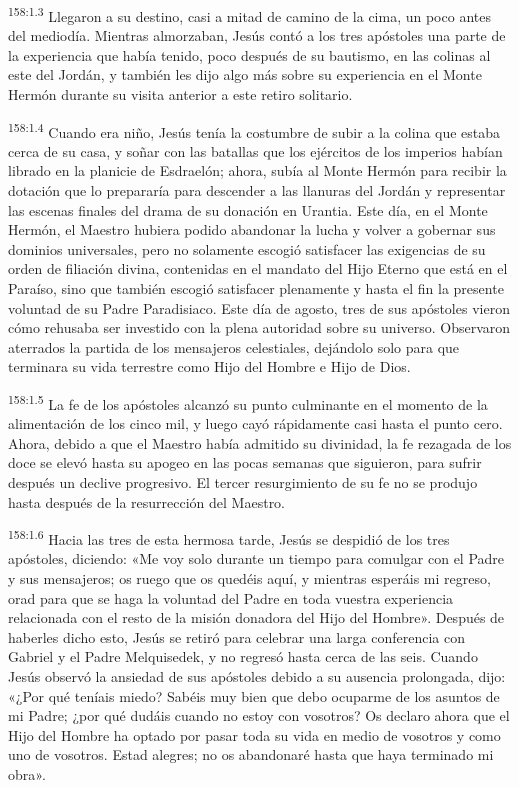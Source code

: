 \par 
\textsuperscript{158:1.3} Llegaron a su destino, casi a mitad de camino de la cima, un poco antes del mediodía. Mientras almorzaban, Jesús contó a los tres apóstoles una parte de la experiencia que había tenido, poco después de su bautismo, en las colinas al este del Jordán, y también les dijo algo más sobre su experiencia en el Monte Hermón durante su visita anterior a este retiro solitario.

\par 
\textsuperscript{158:1.4} Cuando era niño, Jesús tenía la costumbre de subir a la colina que estaba cerca de su casa, y soñar con las batallas que los ejércitos de los imperios habían librado en la planicie de Esdraelón; ahora, subía al Monte Hermón para recibir la dotación que lo prepararía para descender a las llanuras del Jordán y representar las escenas finales del drama de su donación en Urantia. Este día, en el Monte Hermón, el Maestro hubiera podido abandonar la lucha y volver a gobernar sus dominios universales, pero no solamente escogió satisfacer las exigencias de su orden de filiación divina, contenidas en el mandato del Hijo Eterno que está en el Paraíso, sino que también escogió satisfacer plenamente y hasta el fin la presente voluntad de su Padre Paradisiaco. Este día de agosto, tres de sus apóstoles vieron cómo rehusaba ser investido con la plena autoridad sobre su universo. Observaron aterrados la partida de los mensajeros celestiales, dejándolo solo para que terminara su vida terrestre como Hijo del Hombre e Hijo de Dios.

\par 
\textsuperscript{158:1.5} La fe de los apóstoles alcanzó su punto culminante en el momento de la alimentación de los cinco mil, y luego cayó rápidamente casi hasta el punto cero. Ahora, debido a que el Maestro había admitido su divinidad, la fe rezagada de los doce se elevó hasta su apogeo en las pocas semanas que siguieron, para sufrir después un declive progresivo. El tercer resurgimiento de su fe no se produjo hasta después de la resurrección del Maestro.

\par 
\textsuperscript{158:1.6} Hacia las tres de esta hermosa tarde, Jesús se despidió de los tres apóstoles, diciendo: «Me voy solo durante un tiempo para comulgar con el Padre y sus mensajeros; os ruego que os quedéis aquí, y mientras esperáis mi regreso, orad para que se haga la voluntad del Padre en toda vuestra experiencia relacionada con el resto de la misión donadora del Hijo del Hombre». Después de haberles dicho esto, Jesús se retiró para celebrar una larga conferencia con Gabriel y el Padre Melquisedek, y no regresó hasta cerca de las seis. Cuando Jesús observó la ansiedad de sus apóstoles debido a su ausencia prolongada, dijo: «¿Por qué teníais miedo? Sabéis muy bien que debo ocuparme de los asuntos de mi Padre; ¿por qué dudáis cuando no estoy con vosotros? Os declaro ahora que el Hijo del Hombre ha optado por pasar toda su vida en medio de vosotros y como uno de vosotros. Estad alegres; no os abandonaré hasta que haya terminado mi obra».


